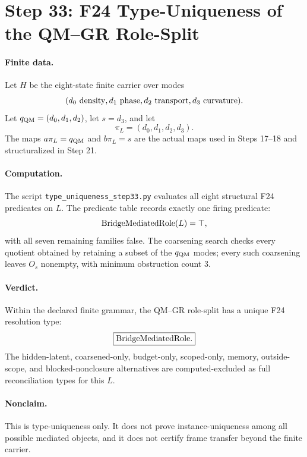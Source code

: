 \section*{Step 33: F24 Type-Uniqueness of the QM--GR Role-Split}

\paragraph{Finite data.}
Let \(H\) be the eight-state finite carrier over modes
\[
  (d_0\ {\rm density}, d_1\ {\rm phase}, d_2\ {\rm transport}, d_3\ {\rm curvature}).
\]
Let \(q_{\rm QM}=(d_0,d_1,d_2)\), let \(s=d_3\), and let
\[
  \pi_L=(d_0,d_1,d_2,d_3).
\]
The maps \(a\pi_L=q_{\rm QM}\) and \(b\pi_L=s\) are the actual maps used in Steps 17--18 and structuralized in Step 21.

\paragraph{Computation.}
The script \texttt{type\_uniqueness\_step33.py} evaluates all eight structural F24 predicates on \(L\).  The predicate table records exactly one firing predicate:
\[
  {\rm BridgeMediatedRole}(L)=\top,
\]
with all seven remaining families false.  The coarsening search checks every quotient obtained by retaining a subset of the \(q_{\rm QM}\) modes; every such coarsening leaves \(O_s\) nonempty, with minimum obstruction count \(3\).

\paragraph{Verdict.}
Within the declared finite grammar, the QM--GR role-split has a unique F24 resolution type:
\[
  \boxed{{\rm BridgeMediatedRole}.}
\]
The hidden-latent, coarsened-only, budget-only, scoped-only, memory, outside-scope, and blocked-nonclosure alternatives are computed-excluded as full reconciliation types for this \(L\).

\paragraph{Nonclaim.}
This is type-uniqueness only.  It does not prove instance-uniqueness among all possible mediated objects, and it does not certify frame transfer beyond the finite carrier.
